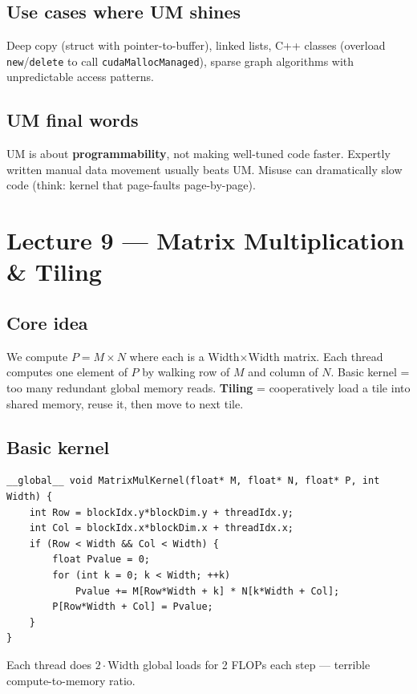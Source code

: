 \documentclass[10pt]{article}
\begin{document}
\subsection*{Use cases where UM shines}
Deep copy (struct with pointer-to-buffer), linked lists, C++ classes (overload \texttt{new}/\texttt{delete} to call \texttt{cudaMallocManaged}), sparse graph algorithms with unpredictable access patterns.

\subsection*{UM final words}
UM is about \textbf{programmability}, not making well-tuned code faster. Expertly written manual data movement usually beats UM. Misuse can dramatically slow code (think: kernel that page-faults page-by-page).

\hrulefill

\section{Lecture 9 — Matrix Multiplication \& Tiling}

\subsection*{Core idea}
We compute $P = M \times N$ where each is a Width$\times$Width matrix. Each thread computes one element of $P$ by walking row of $M$ and column of $N$. Basic kernel = too many redundant global memory reads. \textbf{Tiling} = cooperatively load a tile into shared memory, reuse it, then move to next tile.

\subsection*{Basic kernel}
\begin{lstlisting}
__global__ void MatrixMulKernel(float* M, float* N, float* P, int Width) {
    int Row = blockIdx.y*blockDim.y + threadIdx.y;
    int Col = blockIdx.x*blockDim.x + threadIdx.x;
    if (Row < Width && Col < Width) {
        float Pvalue = 0;
        for (int k = 0; k < Width; ++k)
            Pvalue += M[Row*Width + k] * N[k*Width + Col];
        P[Row*Width + Col] = Pvalue;
    }
}
\end{lstlisting}
Each thread does $2\cdot\text{Width}$ global loads for 2 FLOPs each step — terrible compute-to-memory ratio.
\end{document}
